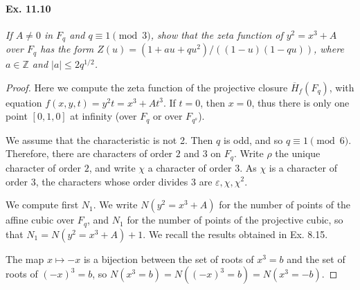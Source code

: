 \documentclass[11pt,a4paper]{article}
\newcommand{\Z}{\mathbb{Z}}
\begin{document}
\paragraph{Ex. 11.10}{\it  If $A \ne 0$ in $F_q$ and $q \equiv 1 \pmod 3$, show that the zeta function of $y^2 = x^3 + A$ over $F_q$ has the form $Z(u) =(1+au+qu^2)/((1-u)(1-qu))$, where $a \in \Z$ and $|a| \leq 2q^{1/2}$.
}
\begin{proof} 

Here we compute the zeta function of the projective closure $\overline{H}_f(F_q)$, with equation $f(x,y,t) =y^2 t = x^3 + At^3$. If $t= 0$, then $x=0$, thus there is only one point $[0,1,0]$ at infinity (over $F_q$ or over $F_{q^s}$).

We assume that the characteristic is not 2. Then $q$ is odd, and so $q\equiv 1 \pmod 6$. Therefore, there are characters of order $2$ and $3$ on $F_q$. Write $\rho$ the unique character of order $2$, and write $\chi$ a character of order $3$. As $\chi$ is a character of order 3, the characters whose order divides 3 are $\varepsilon,\chi,\chi^2$.

We compute first $N_1$. We write $N(y^2=x^3+A)$ for the number of points of the affine cubic over $F_q$, and $N_1$ for the number of points of the projective cubic, so that $N_1 = N(y^2=x^3+A) + 1$. We recall the results obtained in Ex. 8.15.

The map $x \mapsto -x$ is a bijection between the set of roots of $x^3 = b$ and the set of roots of $(-x)^3 = b$, so $N(x^3 = b) = N((-x)^3 = b) = N(x^3 = -b)$.


\end{proof}
\end{document}
